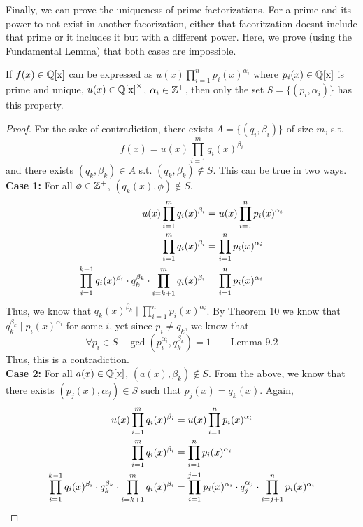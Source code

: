 Finally, we can prove the uniqueness of prime factorizations. For a prime and its power to not exist in another facorization, either that facoritzation doesnt include that prime or it includes it but with a different power. Here, we prove (using the Fundamental Lemma) that both cases are impossible.
\begin{lemma}
    If $f(x) \in \operatorname{\mathbb{Q}[x]}$ can be expressed as $u(x)\prod _{i=1}^n p_i(x)^{\alpha_i}$ where $p_i(x) \in \operatorname{\mathbb{Q}[x]}$ is prime and unique, $u(x) \in \operatorname{\mathbb{Q}[x]}^{\times}$,
    $\alpha_i \in \mathbb{Z}^+$, then only the set $S= \{(p_i, \alpha_i)\}$ has this property. 
\end{lemma}
\begin{proof}
For the sake of contradiction, there exists $A = \{(q_i, \beta_i)\}$ of size $m$, s.t. \[f(x) = u(x)\prod _{i=1}^mq_i(x)^{\beta_i}\] and there exists $(q_k, \beta_k) \in A$ s.t. $(q_k, \beta_k) \notin S$. This can be true in two ways.\\
\textbf{Case 1: } For all $ \phi \in \mathbb{Z}^+$, $(q_k(x), \phi) \notin S$.  
\begin{align*}
    u(x)\prod _{i=1}^mq_i(x)^{\beta_i} &= u(x)\prod _{i=1}^n p_i(x)^{\alpha_i} \\
    \prod _{i=1}^mq_i(x)^{\beta_i} &= \prod _{i=1}^n p_i(x)^{\alpha_i}\\
    \prod _{i=1}^{k-1}q_i(x)^{\beta_i} \cdot q_k^{\beta_k} \cdot \prod _{i=k+1}^{m}q_i(x)^{\beta_i} &= \prod _{i=1}^n p_i(x)^{\alpha_i}\\
\end{align*}
Thus, we know that $q_k(x)^{\beta_k} \mid \prod _{i=1}^n p_i(x)^{\alpha_i}$. By Theorem 10 we know that $q_k^{\beta_k} \mid p_i(x)^{\alpha_i}$ for some $i$, yet since $p_i \neq q_k$, we know that 
\[\forall p_i \in S \quad \gcd(p_i^{\alpha_i}, q_k^{\beta_k}) = 1 \qquad \text{Lemma 9.2}\] Thus, this is a contradiction.\\
\textbf{Case 2: } For all $a(x) \in \operatorname{\mathbb{Q}[x]}$, $(a(x), \beta_k) \notin S$. From the above, we know that there exists $(p_j(x), \alpha_j) \in S$ such that $p_j(x) = q_k(x)$. Again, 
\begin{align*}
    u(x)\prod _{i=1}^mq_i(x)^{\beta_i} &= u(x)\prod _{i=1}^n p_i(x)^{\alpha_i} \\
    \prod _{i=1}^mq_i(x)^{\beta_i} &= \prod _{i=1}^n p_i(x)^{\alpha_i}\\
    \prod _{i=1}^{k-1}q_i(x)^{\beta_i} \m q_k^{\beta_k} \m \prod _{i=k+1}^{m}q_i(x)^{\beta_i} &= \prod _{i=1}^{j-1}p_i(x)^{\alpha_i} \m q_j^{\alpha_j} \m \prod _{i=j+1}^{n}p_i(x)^{\alpha_i}\\

\end{align*}
\end{proof}
